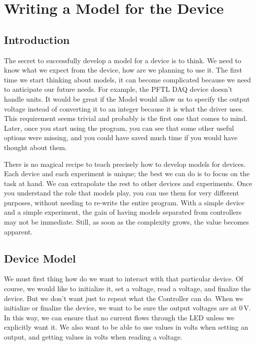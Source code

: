 \chapter{Writing a Model for the Device}\label{chapter:device-model}

\section{Introduction}
The secret to successfully develop a model for a device is to think. We need to know what we expect from the device, how are we planning to use it. The first time we start thinking about models, it can become complicated because we need to anticipate our future needs. For example, the {PFTL DAQ} device doesn't handle units. It would be great if the Model would allow us to specify the output voltage instead of converting it to an integer because it is what the driver uses. This requirement seems trivial and probably is the first one that comes to mind. Later, once you start using the program, you can see that some other useful options were missing, and you could have saved much time if you would have thought about them.

There is no magical recipe to teach precisely how to develop models for devices. Each device and each experiment is unique; the best we can do is to focus on the task at hand. We can extrapolate the rest to other devices and experiments. Once you understand the role that models play, you can use them for very different purposes, without needing to re-write the entire program. With a simple device and a simple experiment, the gain of having models separated from controllers may not be immediate. Still, as soon as the complexity grows, the value becomes apparent.


\section{Device Model}\label{sec:device-model}
We must first thing how do we want to interact with that particular device. Of course, we would like to initialize it, set a voltage, read a voltage, and finalize the device. But we don't want just to repeat what the Controller can do. When we initialize or finalize the device, we want to be sure the output voltages are at $0\,\textrm{V}$. In this way, we can ensure that no current flows through the LED unless we explicitly want it. We also want to be able to use values in volts when setting an output, and getting values in volts when reading a voltage.

